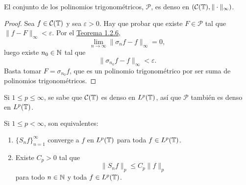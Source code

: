 \documentclass[a4paper, 12pt, oneside]{book}
\begin{document}
\begin{lemma}
    El conjunto de los polinomios trigonométricos, $\mathcal{P}$, es denso en $(\mathcal{C}(\mathbb T),\|\cdot\|_\infty)$.
\end{lemma}

\begin{proof}
    Sea $f \in \mathcal{C}(\mathbb T)$ y sea $\varepsilon > 0$. Hay que probar que existe $F \in \mathcal{P}$ tal que $\|f-F\|_\infty < \varepsilon$. Por el \hyperref[1.2.6]{\color{blue}Teorema 1.2.6},
    \[\lim_{n \to \infty} \|\sigma_nf-f\|_\infty = 0,\]
    luego existe $n_0 \in \mathbb N$ tal que
    \[\|\sigma_{n_0}f-f\|_\infty < \varepsilon.\]
    Basta tomar $F = \sigma_{n_0}f$, que es un polinomio trigonométrico por ser suma de polinomios trigonométricos.
\end{proof}

Si $1 \leq p \leq \infty$, se sabe que $\mathcal{C}(\mathbb T)$ es denso en $L^p(\mathbb T)$, así que $\mathcal{P}$ también es denso en $L^p(\mathbb T)$.

\begin{lemma}\label{3.0.2}
    Si $1 \leq p < \infty$, son equivalentes:
    \begin{enumerate}
        \item $\{S_nf\}_{n=1}^\infty$ converge a $f$ en $L^p(\mathbb T)$ para toda $f \in L^p(\mathbb T)$.
        \item Existe $C_p > 0$ tal que
        \[\|S_nf\|_{p} \leq C_p \|f\|_{p}\]
        para todo $n \in \mathbb N$ y toda $f \in L^p(\mathbb T)$.
    \end{enumerate}
\end{lemma}
\end{document}
